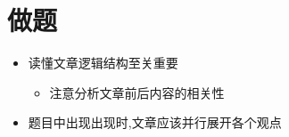 \chapter{做题}

\begin{itemize}
  \item 读懂文章逻辑结构至关重要
  \begin{itemize}
    \item 注意分析文章前后内容的相关性
  \end{itemize}

  \item 题目中出现出现时,文章应该并行展开各个观点
\end{itemize}